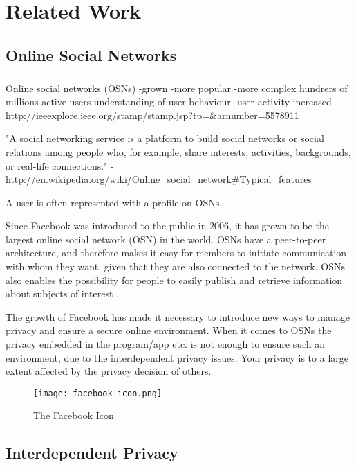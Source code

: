 \chapter{Related Work}
\label{chp:relatedwork} 


\section{Online Social Networks}
\paragraph{}

Online social networks (OSNs)  
-grown
-more popular
-more complex
hundrers of millions active users
understanding of user behaviour
-user activity increased 
-http://ieeexplore.ieee.org/stamp/stamp.jsp?tp=&arnumber=5578911

"A social networking service is a platform to build social networks or social relations among people who, for example, share interests, activities, backgrounds, or real-life connections." - http://en.wikipedia.org/wiki/Online_social_network#Typical_features


A user is often represented with a profile on OSNs. 

Since Facebook was introduced to the public in 2006, it has grown to be the largest online social network (OSN) in the world. OSNs have a peer-to-peer architecture, and therefore makes it easy for members to initiate communication with whom they want, given that they are also connected to the network. OSNs also enables the possibility for people to easily publish and retrieve information about subjects of interest \cite{DPBook}.


The growth of Facebook has made it necessary to introduce new ways to manage privacy and ensure a secure online environment. When it comes to OSNs the privacy embedded in the program/app etc. is not enough to ensure such an environment, due to the interdependent privacy issues. Your privacy is to a large extent affected by the privacy decision of others.

\begin{figure}[h!]
\centering
\texttt{[image: facebook-icon.png]}
\caption{The Facebook Icon}
\end{figure}


\section{Interdependent Privacy}


